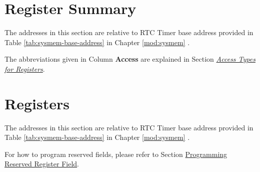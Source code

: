 \documentclass[main\_\_EN.tex]{subfiles}
\begin{document}



\newpage
\hypertarget{rtctimer-reg-summ}{}
\section{Register Summary}
\label{sec:rtctimer-reg-summ}

The addresses in this section are relative to RTC Timer base address provided in Table \ref{tab:sysmem-base-address} in Chapter \ref{mod:sysmem} \textit{}.

The abbreviations given in Column \textbf{Access} are explained in Section \hyperref[glossary-access-types]{\textit{Access Types for Registers}}.






\newpage
\section{Registers}

The addresses in this section are relative to RTC Timer base address provided in Table \ref{tab:sysmem-base-address} in Chapter \ref{mod:sysmem} \textit{}.

For how to program reserved fields, please refer to Section \hyperref[programming-reserved-field]{Programming Reserved Register Field}.


\end{document}
